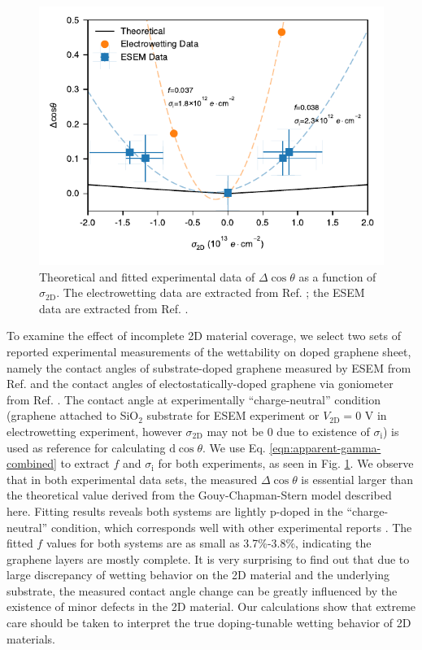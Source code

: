 \documentclass[aps,prl,reprint,groupedaddress,amsmath,amssymb, showpacs]{revtex4-1}
\begin{document}
\begin{figure}[htbp]
\centering
\includegraphics[width=0.95\linewidth]{../img/plot-fitting.pdf}
\caption{\label{fig:f-nc-exp}
Theoretical and fitted experimental data of \(\Delta\cos\theta\) as a function of \(\sigma_{\mathrm{2D}}\). The electrowetting data are extracted from Ref. \cite{hong_mechanism_2016}; the ESEM data are extracted from Ref. \cite{ashraf_doping-induced_2016}.}
\end{figure}

To examine the effect of incomplete 2D material coverage, we select
two sets of reported experimental measurements of the wettability on
doped graphene sheet, namely the contact angles of substrate-doped
graphene measured by ESEM from Ref. \cite{ashraf_doping-induced_2016}
and the contact angles of electostatically-doped graphene via
goniometer from Ref. \cite{hong_mechanism_2016}. The contact angle at
experimentally ``charge-neutral'' condition (graphene attached to SiO\(_{\text{2}}\)
substrate for ESEM experiment or \(V_{\mathrm{2D}}=0\) V in
electrowetting experiment, however \(\sigma_{\mathrm{2D}}\) may not be 0
due to existence of \(\sigma_{\mathrm{i}}\)) is used as reference for
calculating \(\mathrm{d}\cos\theta\). We use
Eq. \ref{eqn:apparent-gamma-combined} to extract \(f\) and
\(\sigma_{\mathrm{i}}\) for both experiments, as seen in
Fig. \ref{fig:f-nc-exp}. We observe that in both experimental data sets,
the measured \(\Delta \cos \theta\) is essential larger than the
theoretical value derived from the Gouy-Chapman-Stern model described
here. Fitting results reveals both systems are lightly p-doped in the
``charge-neutral'' condition, which corresponds well with other
experimental reports
\cite{Shih2015PartiallyScreened,goniszewski_correlation_2016}.  The
fitted \(f\) values for both systems are as small as 3.7\%-3.8\%,
indicating the graphene layers are mostly complete. It is very
surprising to find out that due to large discrepancy of wetting
behavior on the 2D material and the underlying substrate, the measured
contact angle change can be greatly influenced by the existence of
minor defects in the 2D material. Our calculations show that extreme
care should be taken to interpret the true doping-tunable wetting
behavior of 2D materials.
\end{document}
